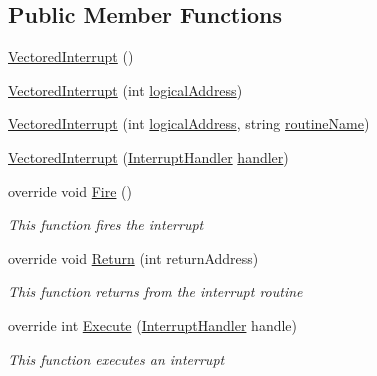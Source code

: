 \subsection*{Public Member Functions}
\begin{DoxyCompactItemize}
\item 
\hyperlink{class_c_p_u___o_s___simulator_1_1_c_p_u_1_1_interrupts_1_1_vectored_interrupt_ab0a936425c3af22d7626b5c5638d3f71}{Vectored\+Interrupt} ()
\item 
\hyperlink{class_c_p_u___o_s___simulator_1_1_c_p_u_1_1_interrupts_1_1_vectored_interrupt_a45bf2e98f7731480f62b89397c8cef8e}{Vectored\+Interrupt} (int \hyperlink{class_c_p_u___o_s___simulator_1_1_c_p_u_1_1_interrupts_1_1_vectored_interrupt_ad59ab75bdd99d70caa63d5ac36b532e8}{logical\+Address})
\item 
\hyperlink{class_c_p_u___o_s___simulator_1_1_c_p_u_1_1_interrupts_1_1_vectored_interrupt_a14d8bc2e4880fdc90ee401bd8f968068}{Vectored\+Interrupt} (int \hyperlink{class_c_p_u___o_s___simulator_1_1_c_p_u_1_1_interrupts_1_1_vectored_interrupt_ad59ab75bdd99d70caa63d5ac36b532e8}{logical\+Address}, string \hyperlink{class_c_p_u___o_s___simulator_1_1_c_p_u_1_1_interrupts_1_1_vectored_interrupt_a8f7cd5a533089f96fdc12a97c083a7fe}{routine\+Name})
\item 
\hyperlink{class_c_p_u___o_s___simulator_1_1_c_p_u_1_1_interrupts_1_1_vectored_interrupt_aaaacef7cdb797f358730aba5225cf0c1}{Vectored\+Interrupt} (\hyperlink{class_c_p_u___o_s___simulator_1_1_c_p_u_1_1_interrupts_1_1_interrupt_handler}{Interrupt\+Handler} \hyperlink{class_c_p_u___o_s___simulator_1_1_c_p_u_1_1_interrupts_1_1_vectored_interrupt_a13e9b0f3b6f66f67fa510bd9930b3765}{handler})
\item 
override void \hyperlink{class_c_p_u___o_s___simulator_1_1_c_p_u_1_1_interrupts_1_1_vectored_interrupt_ab787d3cfa491a68a8baa2b121b8fff92}{Fire} ()
\begin{DoxyCompactList}\small\item\em This function fires the interrupt \end{DoxyCompactList}\item 
override void \hyperlink{class_c_p_u___o_s___simulator_1_1_c_p_u_1_1_interrupts_1_1_vectored_interrupt_a9a07f2283b9ae7f644dbdccb760f82ce}{Return} (int return\+Address)
\begin{DoxyCompactList}\small\item\em This function returns from the interrupt routine \end{DoxyCompactList}\item 
override int \hyperlink{class_c_p_u___o_s___simulator_1_1_c_p_u_1_1_interrupts_1_1_vectored_interrupt_a79136e3425270dd0862e4556e42ebc38}{Execute} (\hyperlink{class_c_p_u___o_s___simulator_1_1_c_p_u_1_1_interrupts_1_1_interrupt_handler}{Interrupt\+Handler} handle)
\begin{DoxyCompactList}\small\item\em This function executes an interrupt \end{DoxyCompactList}\end{DoxyCompactItemize}
